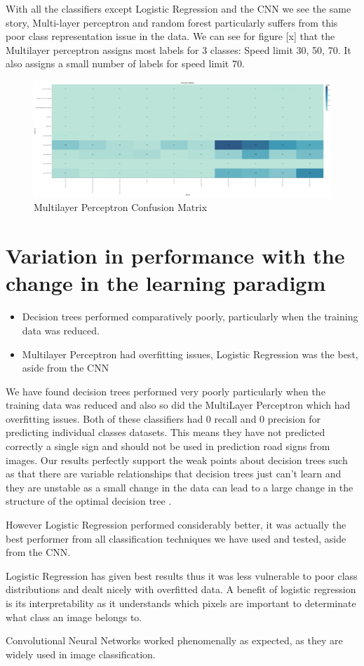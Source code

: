 \documentclass[11pt]{article}
\begin{document}
With all the classifiers except Logistic Regression and the CNN we see the same story, Multi-layer perceptron and random forest particularly suffers from this poor class representation issue in the data. We can see for figure [x] that the Multilayer perceptron assigns most labels for 3 classes: Speed limit 30, 50, 70. It also assigns a small number of labels for speed limit 70.


\begin{figure}[h]
  \caption {Multilayer Perceptron Confusion Matrix}
  \centering 
  \includegraphics[width = \textwidth, height = 0.3\textheight, keepaspectratio]{Images/Sec1-ConfMat2.png}
\end{figure}

\newpage
\section{Variation in performance with the change in the learning paradigm}
\begin{itemize}
  \item Decision trees performed comparatively poorly, particularly when the training data was reduced.
  \item Multilayer Perceptron had overfitting issues, Logistic Regression was the best, aside from the CNN
\end{itemize}
We have found decision trees performed very poorly particularly when the training data was reduced and also so did the MultiLayer Perceptron which had overfitting issues. Both of these classifiers had 0 recall and 0 precision for predicting individual classes datasets. This means they have not predicted correctly a single sign and should not be used in prediction road signs from images. Our results perfectly support the weak points about decision trees such as that there are variable relationships that decision trees just can’t learn and they are unstable as a small change in the data can lead to a large change in the structure of the optimal decision tree \cite{zhaoComparisonDecisionTree2008}.
\par
However Logistic Regression performed considerably better, it was actually the best performer from all classification techniques we have used and tested, aside from the CNN. 
\par
Logistic Regression has given best results thus it was less vulnerable to poor class distributions and dealt nicely with overfitted data. A benefit of logistic regression is its interpretability as it understands which pixels are important to determinate what class an image belongs to.
\par
Convolutional Neural Networks worked phenomenally as expected, as they are widely used in image classification.
\end{document}

